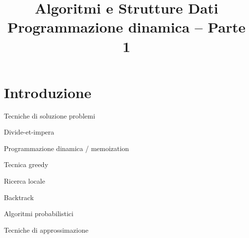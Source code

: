 

\usepackage{epigraph}
\usepackage[normalem]{ulem}
\usepackage{xcolor}
\usepackage{colortbl}
\usepackage{tikz}
\usepackage[normalem]{ulem}
\usepackage[absolute,overlay]{textpos}
\usetikzlibrary{trees}
\usetikzlibrary{shapes}
\usetikzlibrary{positioning}

\setlength{\epigraphwidth}{6cm}

\usepackage{xmpmulti}
\usepackage{listings}


\newcommand*\circled[1]{\tikz[baseline=(char.base)]{
      \node[circle,ball color=blue, shade, 
 color=white,inner sep=1.2pt] (char) {\tiny #1};}}


\title[ASD - Programmazione Dinamica]{\textbf{Algoritmi e Strutture Dati}\\[24pt]Programmazione dinamica -- Parte 1}

\graphicspath{{figs/13/}}





\FrameTitle{}

\FrameContent


\section{Introduzione}

\begin{frame}{Tecniche di soluzione problemi}

\BIL
\item Divide-et-impera 
\item Programmazione dinamica / memoization
\item Tecnica greedy
\item Ricerca locale 
\item Backtrack
\item Algoritmi probabilistici
\item Tecniche di approssimazione
\EIL

\end{frame}

